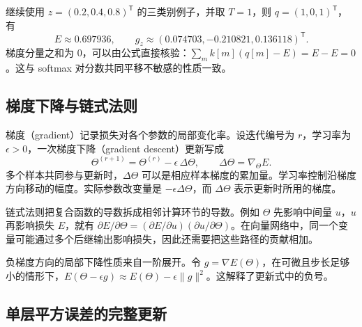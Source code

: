 继续使用 $z=(0.2,0.4,0.8)^{\mathsf T}$ 的三类别例子，并取 $T=1$，则 $q=(1,0,1)^{\mathsf T}$，有
\begin{equation}
 E\approx0.697936,\qquad
 g_z\approx(0.074703,-0.210821,0.136118)^{\mathsf T}.
\end{equation}
梯度分量之和为 0，可以由公式直接核验：$\sum_m k[m](q[m]-E)=E-E=0$。这与 softmax 对分数共同平移不敏感的性质一致。

\subsection{梯度下降与链式法则}

梯度（gradient）记录损失对各个参数的局部变化率。设迭代编号为 $r$，学习率为 $\epsilon>0$，一次梯度下降（gradient descent）更新写成
\begin{equation}
 \Theta^{(r+1)}=\Theta^{(r)}-\epsilon\,\Delta\Theta,
 \qquad \Delta\Theta=\nabla_{\Theta}E.
 \label{l10:eq:gradient-descent}
\end{equation}
多个样本共同参与更新时，$\Delta\Theta$ 可以是相应样本梯度的累加量。学习率控制沿梯度方向移动的幅度。实际参数改变量是 $-\epsilon\Delta\Theta$，而 $\Delta\Theta$ 表示更新时所用的梯度。

链式法则把复合函数的导数拆成相邻计算环节的导数。例如 $\Theta$ 先影响中间量 $u$，$u$ 再影响损失 $E$，就有 $\partial E/\partial\Theta=(\partial E/\partial u)(\partial u/\partial\Theta)$。在向量网络中，同一个变量可能通过多个后继输出影响损失，因此还需要把这些路径的贡献相加。

负梯度方向的局部下降性质来自一阶展开。令 $g=\nabla E(\Theta)$，在可微且步长足够小的情形下，$E(\Theta-\epsilon g)\approx E(\Theta)-\epsilon\lVert g\rVert^2$。这解释了更新式中的负号。

\subsection{单层平方误差的完整更新}

